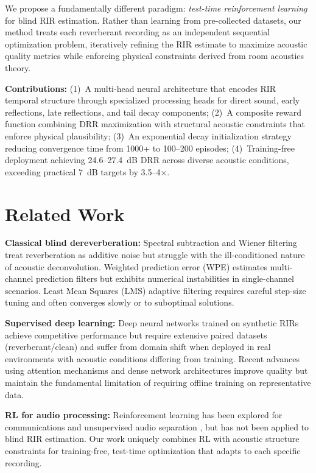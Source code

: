 \documentclass[10pt,conference]{IEEEtran}
\begin{document}
We propose a fundamentally different paradigm: \textit{test-time reinforcement learning} for blind RIR estimation. Rather than learning from pre-collected datasets, our method treats each reverberant recording as an independent sequential optimization problem, iteratively refining the RIR estimate to maximize acoustic quality metrics while enforcing physical constraints derived from room acoustics theory.

\textbf{Contributions:} (1)~A multi-head neural architecture that encodes RIR temporal structure through specialized processing heads for direct sound, early reflections, late reflections, and tail decay components; (2)~A composite reward function combining DRR maximization with structural acoustic constraints that enforce physical plausibility; (3)~An exponential decay initialization strategy reducing convergence time from 1000+ to 100--200 episodes; (4)~Training-free deployment achieving 24.6--27.4~dB DRR across diverse acoustic conditions, exceeding practical 7~dB targets by 3.5--4$\times$.

\section{Related Work}

\textbf{Classical blind dereverberation:} Spectral subtraction \cite{boll1979suppression} and Wiener filtering \cite{lim1979enhancement} treat reverberation as additive noise but struggle with the ill-conditioned nature of acoustic deconvolution. Weighted prediction error (WPE) \cite{nakatani2010speech} estimates multi-channel prediction filters but exhibits numerical instabilities in single-channel scenarios. Least Mean Squares (LMS) adaptive filtering \cite{haykin2008adaptive} requires careful step-size tuning and often converges slowly or to suboptimal solutions.

\textbf{Supervised deep learning:} Deep neural networks trained on synthetic RIRs \cite{kinoshita2017neural,han2015learning} achieve competitive performance but require extensive paired datasets (reverberant/clean) and suffer from domain shift when deployed in real environments with acoustic conditions differing from training. Recent advances using attention mechanisms \cite{vaswani2017attention} and dense network architectures \cite{pandey2022dense} improve quality but maintain the fundamental limitation of requiring offline training on representative data.

\textbf{RL for audio processing:} Reinforcement learning has been explored for communications \cite{ernst2018learning} and unsupervised audio separation \cite{wisdom2020unsupervised}, but has not been applied to blind RIR estimation. Our work uniquely combines RL with acoustic structure constraints for training-free, test-time optimization that adapts to each specific recording.
\end{document}
